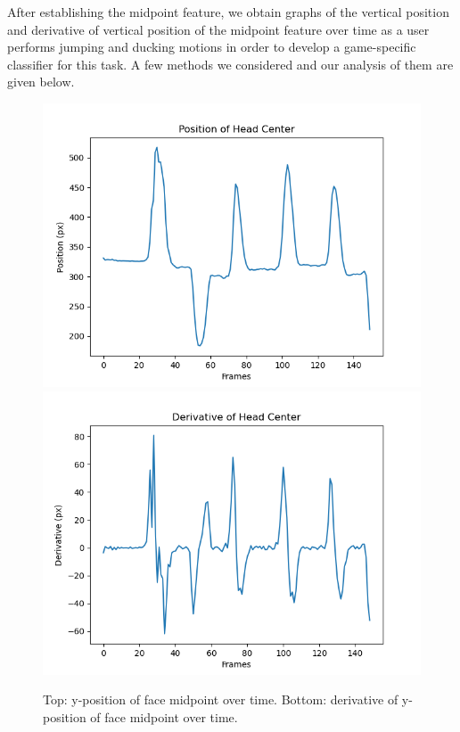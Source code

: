 \documentclass[10pt,twocolumn,letterpaper]{article}
\begin{document}
After establishing the midpoint feature, we obtain graphs of the vertical 
position and derivative of vertical position of the midpoint feature over time 
as a user performs jumping and ducking motions in order to develop a game-specific 
classifier for this task. A few methods we considered and our analysis of them 
are given below.

\begin{figure}[h]
    \centering
    \includegraphics[width = .8\linewidth]{images/center_height.png}
    \includegraphics[width = .8\linewidth]{images/center_deriv.png}
    \caption{Top: y-position of face midpoint over time. Bottom: derivative 
    of y-position of face midpoint over time.}
\end{figure}
\end{document}
